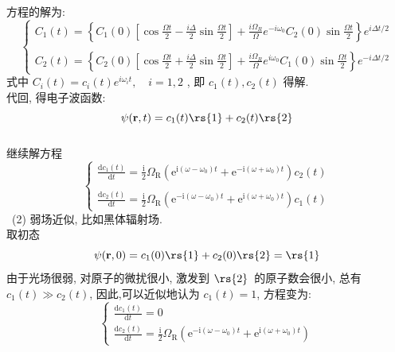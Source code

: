 \begin{frame} 
\frametitle{}
     方程的解为:
     \[ \begin{cases}
        C_1(t) = \left\{ C_1(0) \left[ \cos \frac{ \Omega t}{2} - \frac{i \Delta}{2}\sin \frac{ \Omega t}{2}  \right] + \frac{i\Omega_R}{\Omega} e^{-i \omega_0} C_2(0) \sin \frac{ \Omega t}{2}  \right\} e^{i \Delta t /2} \\ 
        ~\\ 
        C_2(t) = \left\{ C_2(0) \left[ \cos \frac{ \Omega t}{2} + \frac{i \Delta}{2}\sin \frac{ \Omega t}{2}  \right] + \frac{i\Omega_R}{\Omega} e^{i \omega_0} C_1(0) \sin \frac{ \Omega t}{2}  \right\} e^{-i \Delta t /2}
        \end{cases} \] 
    式中 $ C_i(t) = c_i(t) e^{i \omega_i t}, \quad i=1,2 $ , 即 $c_1(t), c_2(t)$ 得解. \\ {\vspace*{1.3em}}
代回, 得电子波函数: 
\[ \psi(\mathbf{r},t) = c_1(t) \rs{1}  + c_2(t) \rs{2} \]
\end{frame}


\begin{frame} 
\frametitle{}
{\Bullet} 继续解方程
\[ \begin{cases}
    \frac{\mathrm{d}c_1(t)}{\mathrm{d}t}=\frac{\mathrm{i}}{2} \Omega_{\mathrm{R}}\left(\mathrm{e}^{\mathrm{i}\left(\omega-\omega_{0}\right) t}+\mathrm{e}^{-\mathrm{i}\left(\omega+\omega_{0}\right) t}\right) c_{2}(t) \\ 
    ~\\
    \frac{\mathrm{d}c_2(t)}{\mathrm{d}t}=\frac{\mathrm{i}}{2} \Omega_{\mathrm{R}}\left(\mathrm{e}^{-\mathrm{i}\left(\omega-\omega_{0}\right) t}+\mathrm{e}^{\mathrm{i}\left(\omega+\omega_{0}\right) t}\right) c_{1}(t)
 \end{cases} \]
    \解 ~(2) 弱场近似, 比如黑体辐射场. \\ 
    取初态\[ \psi(\mathbf{r},0) = c_1(0) \rs{1}  + c_2(0) \rs{2} = \rs{1}  \]
    由于光场很弱, 对原子的微扰很小, 激发到 $\rs{2}$ 的原子数会很小, 总有$c_1(t)\gg c_2(t)$, 
    因此,可以近似地认为 $c_1(t)=1$, 方程变为:
    \[ \begin{cases}
        \frac{\mathrm{d}c_1(t)}{\mathrm{d}t}=0 \\ 
        \frac{\mathrm{d}c_2(t)}{\mathrm{d}t}=\frac{\mathrm{i}}{2} \Omega_{\mathrm{R}}\left(\mathrm{e}^{-\mathrm{i}\left(\omega-\omega_{0}\right) t}+\mathrm{e}^{\mathrm{i}\left(\omega+\omega_{0}\right) t}\right) 
     \end{cases} \]
\end{frame}

